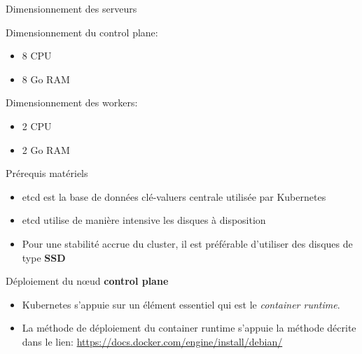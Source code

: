 
\begin{frame}[fragile]{Dimensionnement des serveurs}

   Dimensionnement du control plane:

   \begin{itemize}
      \item 8 CPU
      \item 8 Go RAM
   \end{itemize}

   Dimensionnement des workers:

   \begin{itemize}
      \item 2 CPU
      \item 2 Go RAM
   \end{itemize}

\end{frame}


\begin{frame}[fragile]{Prérequis matériels}

   \begin{itemize}
      \item etcd est la base de données clé-valuers centrale utilisée par Kubernetes
      \item etcd utilise de manière intensive les disques à disposition
      \item Pour une stabilité accrue du cluster, il est préférable d'utiliser des disques de type \textbf{SSD}
   \end{itemize}

\end{frame}


\begin{frame}[fragile]{Déploiement du n{\oe}ud \textbf{control plane}}

   \begin{itemize}
      \item Kubernetes s'appuie sur un élément essentiel qui est le \textit{container runtime}.
      \item La méthode de déploiement du container runtime s'appuie la méthode décrite dans le lien: \url{https://docs.docker.com/engine/install/debian/}
   \end{itemize}

\end{frame}

